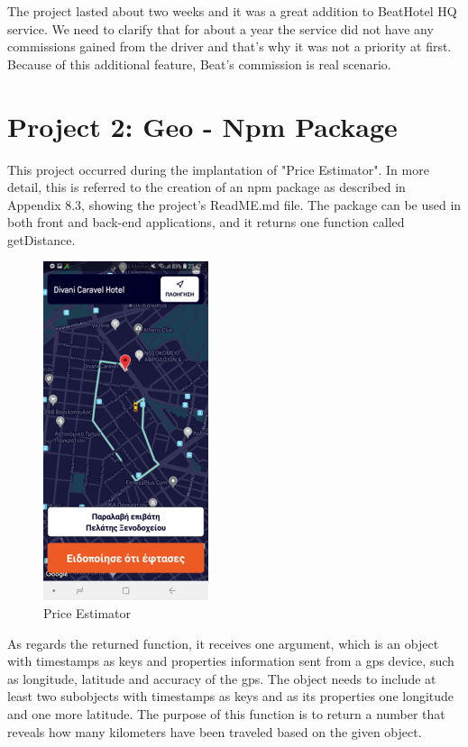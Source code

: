 The project lasted about two weeks and it was a great addition to BeatHotel HQ service. We need to clarify that for about a year the service did not have any commissions gained from the driver and that's why it was not a priority at first. Because of this additional feature, Beat's commission is real scenario. \par 


\section{Project 2: Geo - Npm Package}

This project occurred during the implantation of "Price Estimator". In more detail, this is referred to the creation of an npm package as described in Appendix 8.3, showing the project's ReadME.md file. The package can be used in both front and back-end applications, and it returns one function called getDistance. \par 

\begin{figure}
	\begin{center}
		\includegraphics[scale=0.25]{images/my_projects/price_estimator.png}
	\end{center}
	\caption{Price Estimator}
\end{figure}

As regards the returned function, it receives one argument, which is an object with timestamps as keys and properties information sent from a gps device, such as longitude, latitude and accuracy of the gps. The object needs to include at least two subobjects with timestamps as keys and as its properties one longitude and one more latitude. The purpose of this function is to return a number that reveals how many kilometers have been traveled based on the given object. \par

